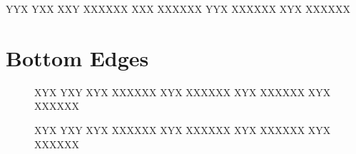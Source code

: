 \documentclass{article}
\begin{document}
\begin{figure}[hbt]
\centering
\RubikCubeSolvedWY
{}
\end{figure}

\RubikCubeGreyAll
{}
{Y}{Y}{X}
{Y}{X}{X}
\RubikFaceBack XXY XXXXXX
\RubikFaceLeft XXX XXXXXX
\RubikFaceRight YYX XXXXXX
\RubikFaceFront XYX XXXXXX
%


\section{}
\section{}
\section{}
\section{}
\section{Bottom Edges}

\begin{figure}[h]
\centering
\RubikCubeGreyAll
{}
{X}{Y}{X}
{Y}{X}{Y}
\RubikFaceBack XYX XXXXXX
\RubikFaceLeft XYX XXXXXX
\RubikFaceRight XYX XXXXXX
\RubikFaceFront XYX XXXXXX
%
\end{figure}

\begin{figure}[h]
\centering
\RubikCubeGreyAll
{}
{X}{Y}{X}
{Y}{X}{Y}
\RubikFaceBack XYX XXXXXX
\RubikFaceLeft XYX XXXXXX
\RubikFaceRight XYX XXXXXX
\RubikFaceFront XYX XXXXXX
%
\end{figure}
\end{document}
